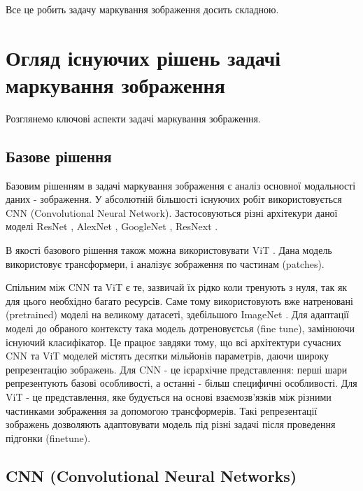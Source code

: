 \documentclass{udstu}
\begin{document}
Все це робить задачу маркування зображення досить складною.


\chapter{Огляд існуючих рішень задачі маркування зображення}

Розглянемо ключові аспекти задачі маркування зображення.

\section{Базове рішення}

Базовим рішенням в задачі маркування зображення є аналіз основної модальності даних - зображення.
У абсолютній більшості існуючих робіт використовується CNN (Convolutional Neural Network).
Застосовуються різні архітекури даної моделі ResNet \cite{resnet}, AlexNet \cite{alexnet},
GoogleNet \cite{googlenet}, ResNext \cite{resnext}.

В якості базового рішення також можна використовувати ViT \cite{vit}. Дана модель використовує
трансформери, і аналізує зображення по частинам (patches).

Спільним між CNN та ViT є те, зазвичай їх рідко коли тренують з нуля, так як для цього необхідно багато ресурсів.
Саме тому використовують вже натреновані (pretrained) моделі на великому датасеті,
здебільшого ImageNet \cite{deng2009imagenet}.
Для адаптації моделі до обраного контексту така модель дотреновуєтсья (fine tune), замінюючи існуючий класифікатор.
Це працює завдяки тому, що всі архітектури сучасних CNN та ViT моделей містять десятки мільйонів параметрів,
даючи широку репрезентацію зображень. Для CNN - це ієрархічне представлення: перші шари репрезентують базові
особливості, а останні - більш специфичні особливості. Для ViT - це представлення, яке будується
на основі взаємозв'язків між різними частинками зображення за допомогою трансформерів.
Такі репрезентації зображень дозволяють адаптовувати модель під різні задачі після проведення підгонки (finetune).

\section*{CNN (Convolutional Neural Networks)}
\end{document}
